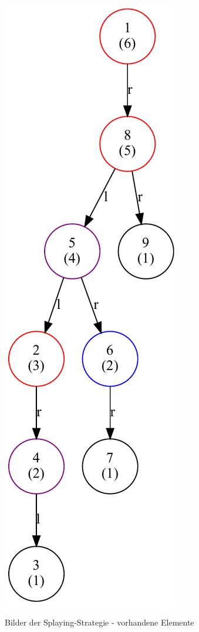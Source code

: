 \begin{figure}[hbt]
{        \includegraphics[scale = 0.32]{img/gv/aufg2_6_FindTP4}\label{fig:splay-findtp4}}
    \caption{Bilder der Splaying-Strategie - vorhandene Elemente}\label{fig:splay}
\end{figure}

